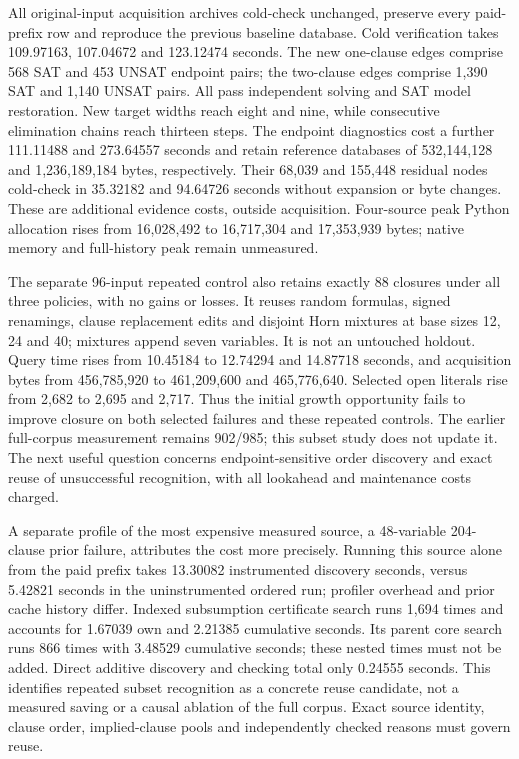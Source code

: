 \documentclass[11pt,a4paper]{article}
\numberwithin{equation}{section}
\theoremstyle{plain}
\theoremstyle{definition}
\theoremstyle{remark}
\begin{document}
All original-input acquisition archives cold-check unchanged, preserve every paid-prefix row and reproduce the previous baseline database. Cold verification takes 109.97163, 107.04672 and 123.12474 seconds. The new one-clause edges comprise 568 SAT and 453 UNSAT endpoint pairs; the two-clause edges comprise 1,390 SAT and 1,140 UNSAT pairs. All pass independent solving and SAT model restoration. New target widths reach eight and nine, while consecutive elimination chains reach thirteen steps. The endpoint diagnostics cost a further 111.11488 and 273.64557 seconds and retain reference databases of 532,144,128 and 1,236,189,184 bytes, respectively. Their 68,039 and 155,448 residual nodes cold-check in 35.32182 and 94.64726 seconds without expansion or byte changes. These are additional evidence costs, outside acquisition. Four-source peak Python allocation rises from 16,028,492 to 16,717,304 and 17,353,939 bytes; native memory and full-history peak remain unmeasured.

The separate 96-input repeated control also retains exactly 88 closures under all three policies, with no gains or losses. It reuses random formulas, signed renamings, clause replacement edits and disjoint Horn mixtures at base sizes 12, 24 and 40; mixtures append seven variables. It is not an untouched holdout. Query time rises from 10.45184 to 12.74294 and 14.87718 seconds, and acquisition bytes from 456,785,920 to 461,209,600 and 465,776,640. Selected open literals rise from 2,682 to 2,695 and 2,717. Thus the initial growth opportunity fails to improve closure on both selected failures and these repeated controls. The earlier full-corpus measurement remains 902/985; this subset study does not update it. The next useful question concerns endpoint-sensitive order discovery and exact reuse of unsuccessful recognition, with all lookahead and maintenance costs charged.

A separate profile of the most expensive measured source, a 48-variable 204-clause prior failure, attributes the cost more precisely. Running this source alone from the paid prefix takes 13.30082 instrumented discovery seconds, versus 5.42821 seconds in the uninstrumented ordered run; profiler overhead and prior cache history differ. Indexed subsumption certificate search runs 1,694 times and accounts for 1.67039 own and 2.21385 cumulative seconds. Its parent core search runs 866 times with 3.48529 cumulative seconds; these nested times must not be added. Direct additive discovery and checking total only 0.24555 seconds. This identifies repeated subset recognition as a concrete reuse candidate, not a measured saving or a causal ablation of the full corpus. Exact source identity, clause order, implied-clause pools and independently checked reasons must govern reuse.
\end{document}
